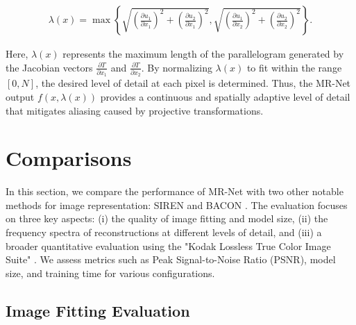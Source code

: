 
\begin{align*}
    \lambda(x)=\max\left\{\sqrt{\left(\frac{\partial u_1}{\partial x_1}\right)^2+\left(\frac{\partial u_2}{\partial x_1}\right)^2}, \sqrt{\left(\frac{\partial u_1}{\partial x_2}\right)^2+\left(\frac{\partial u_2}{\partial x_2}\right)^2}\right\}.
\end{align*}


Here, \(\lambda(x)\) represents the maximum length of the parallelogram generated by the Jacobian vectors \(\frac{\partial T}{\partial x_1}\) and \(\frac{\partial T}{\partial x_2}\). By normalizing \(\lambda(x)\) to fit within the range \([0, N]\), the desired level of detail at each pixel is determined. Thus, the MR-Net output \(f(x, \lambda(x))\) provides a continuous and spatially adaptive level of detail that mitigates aliasing caused by projective transformations.

\section{Comparisons}
\label{sec:comparison}

In this section, we compare the performance of MR-Net with two other notable methods for image representation: SIREN \citep{sitzmann2019siren} and BACON \citep{bacon2021}. The evaluation focuses on three key aspects: (i) the quality of image fitting and model size, (ii) the frequency spectra of reconstructions at different levels of detail, and (iii) a broader quantitative evaluation using the "Kodak Lossless True Color Image Suite" \citep{KodakDataset}. We assess metrics such as Peak Signal-to-Noise Ratio (PSNR), model size, and training time for various configurations.

\subsection{Image Fitting Evaluation}

